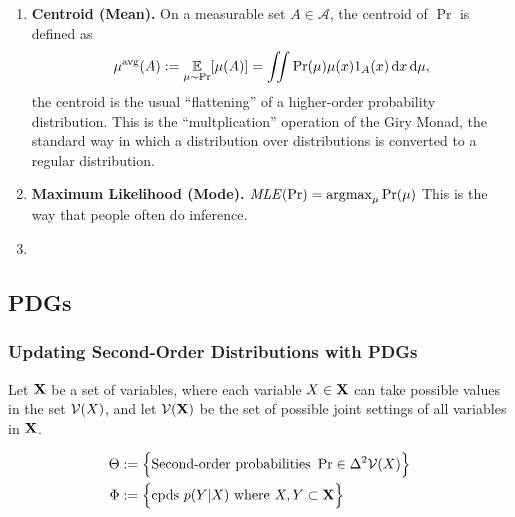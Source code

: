 \documentclass{article}
\begin{document}
\begin{enumerate}
    \item \textbf{Centroid (Mean).}
        On a measurable set $A \in \mathcal A$, the centroid of $\Pr$ is defined as
        \[
            \mu^{\text{avg}}(A) := \operatorname*{\mathbb{E}}_{\mu \sim \Pr}[ \mu(A)] =
                \iint \Pr(\mu) \mu(x) 1_{A}(x)\, \mathrm d x\,\mathrm d\mu,
        \]
        the centroid is the usual ``flattening'' of a higher-order probability distribution.
        This is the ``multplication'' operation of the Giry Monad, the standard way in which a distribution over distributions is converted to a regular distribution.

    \item \textbf{Maximum Likelihood (Mode).}
        $\mathit{MLE}(\Pr) = \operatorname*{\arg\!\max}_\mu \Pr(\mu)$
        This is the way that people often do inference.

    \item


\end{enumerate}


\subsection{PDGs}


\subsubsection{Updating Second-Order Distributions with PDGs}
Let $\mathbf{X}$ be a set of variables, where each variable $X \in \mathbf{X}$ can take possible values in the set $\mathcal V(X)$, and let $\mathcal V(\mathbf{X})$ be the set of possible joint settings of all variables in $\mathbf{X}$.

\begin{align*}
    \Theta &:=
        \Big\{
        \text{Second-order probabilities}~ \Pr \in \Delta^2 \mathcal V(X)
        \Big\} \\
    \Phi &:= \Big\{ \text{cpds}~ p(Y|X)
        \text{ where }  X, Y \subset \mathbf{X} \Big\}
\end{align*}
\end{document}
